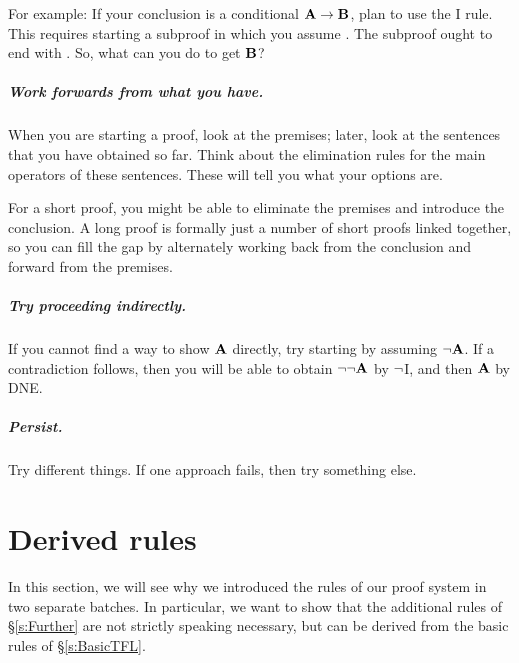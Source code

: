 For example: If your conclusion is a conditional $\mathbf{A}\rightarrow\mathbf{B}$, plan to use the {\eif}I rule. This requires starting a subproof in which you assume . The subproof ought to end with . So, what can you do to get $\mathbf{B}$?

\paragraph{Work forwards from what you have.}
When you are starting a proof, look at the premises; later, look at the sentences that you have obtained so far. Think about the elimination rules for the main operators of these sentences. These will tell you what your options are.

For a short proof, you might be able to eliminate the premises and introduce the conclusion. A long proof is formally just a number of short proofs linked together, so you can fill the gap by alternately working back from the conclusion and forward from the premises.

\paragraph{Try proceeding indirectly.}
If you cannot find a way to show $\mathbf{A}$ directly, try starting by assuming $\neg \mathbf{A}$. If a contradiction follows, then you will be able to obtain $\neg \neg \mathbf{A}$ by $\neg$I, and then $\mathbf{A}$ by DNE.  

\paragraph{Persist.}
Try different things. If one approach fails, then try something else.


\chapter{Derived rules}\label{s:Derived}
In this section, we will see why we introduced the rules of our proof system in two separate batches. In particular, we want to show that the additional rules of \S\ref{s:Further} are not strictly speaking necessary, but can be derived from the basic rules of \S\ref{s:BasicTFL}.

